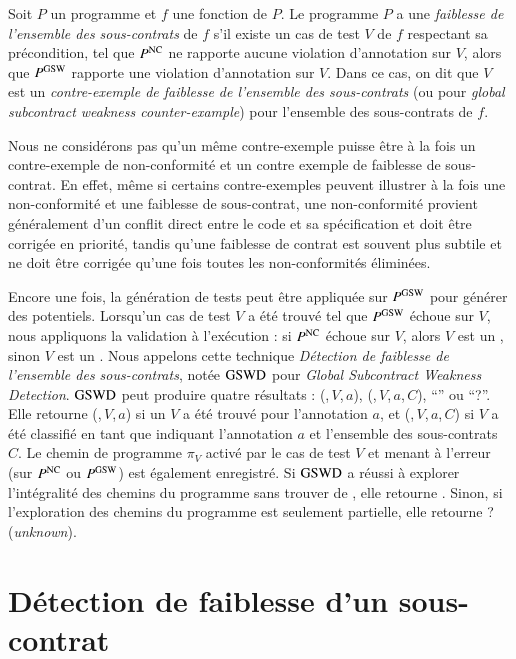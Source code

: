 \begin{definition} 
  \label{def:GSW}
  Soit $P$ un programme et $f$ une fonction de $P$.
  Le programme $P$ a une \emph{faiblesse de l'ensemble des sous-contrats} de $f$
  s'il existe un cas de test $V$ de $f$ respectant sa précondition, tel que
  $P^{\mathrm{NC}}$ ne rapporte aucune violation d'annotation sur $V$, alors que
  $P^{\mathrm{GSW}}$ rapporte une violation d'annotation sur $V$.
  Dans ce cas, on dit que $V$ est un
  \emph{contre-exemple de faiblesse de l'ensemble des sous-contrats} (ou \GSWCE
  pour {\em global subcontract weakness counter-example}) pour l'ensemble des
  sous-contrats de $f$.
\end{definition}

Nous ne considérons pas qu'un même contre-exemple puisse être à la fois un
contre-exemple de non-conformité et un contre exemple de faiblesse de
sous-contrat.
En effet, même si certains contre-exemples peuvent illustrer à la fois une
non-conformité et une faiblesse de sous-contrat, une non-conformité provient
généralement d'un conflit direct entre le code et sa spécification et doit être
corrigée en priorité, tandis qu'une faiblesse de contrat est souvent plus
subtile et ne doit être corrigée qu'une fois toutes les non-conformités
éliminées.

Encore une fois, la génération de tests peut être appliquée sur $P^{\mathrm{GSW}}$ pour
générer des \GSWCE potentiels.
Lorsqu'un cas de test $V$ a été trouvé tel que $P^{\mathrm{GSW}}$ échoue sur $V$, nous
appliquons la validation à l'exécution :
si $P^{\mathrm{NC}}$ échoue sur $V$, alors $V$ est un \NCCE, sinon $V$ est un \GSWCE.
Nous appelons cette technique
\emph{Détection de faiblesse de l'ensemble des sous-contrats}, notée $\mathrm{GSWD}$
pour \textit{Global Subcontract Weakness Detection}.
$\mathrm{GSWD}$ peut produire quatre résultats : (\nc,\,$V$,\,$a$),
(\cw,\,$V$,\,$a$,\,$C$), ``\no'' ou ``\textsf{?}''.
Elle retourne (\nc,\,$V$,\,$a$) si un \NCCE $V$ a été trouvé pour l'annotation
$a$, et (\cw,\,$V$,\,$a$,\,$C$) si $V$ a été classifié en tant que \GSWCE
indiquant l'annotation $a$ et l'ensemble des sous-contrats $C$.
Le chemin de programme $\pi_V$ activé par le cas de test $V$ et menant à
l'erreur (sur $P^{\mathrm{NC}}$ ou $P^{\mathrm{GSW}}$) est également enregistré.
Si $\mathrm{GSWD}$ a réussi à explorer l'intégralité des chemins du programme sans
trouver de \GSWCE, elle retourne \no.
Sinon, si l'exploration des chemins du programme est seulement partielle, elle
retourne \textsf{?} ({\em unknown}).


\section{Détection de faiblesse d'un sous-contrat}
\label{sec:swd-single}


